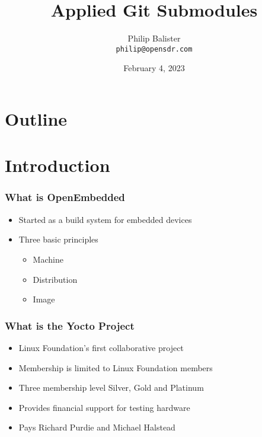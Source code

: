 \documentclass{beamer}
\title{Applied Git Submodules}
\institute{Open SDR}
\author{Philip Balister \\
\tt\tiny philip@opensdr.com}
\date{February 4, 2023}
\begin{document}
 

\begin{frame}
\titlepage
\end{frame}

\section*{Outline}

\begin{frame}
  \tableofcontents
\end{frame}

\section{Introduction}

\begin{frame}
\frametitle{What is OpenEmbedded}

\begin{itemize}
\item Started as a build system for embedded devices
\item Three basic principles
	\begin{itemize}
		\item{Machine}
		\item{Distribution}
		\item{Image}
	\end{itemize}
\end{itemize}

\end{frame}

\begin{frame}
\frametitle{What is the Yocto Project}

\begin{itemize}
\item Linux Foundation's first collaborative project
\item Membership is limited to Linux Foundation members
\item Three membership level Silver, Gold and Platinum
\item Provides financial support for testing hardware
\item Pays Richard Purdie and Michael Halstead
\end{itemize}

\end{frame}
\end{document}
